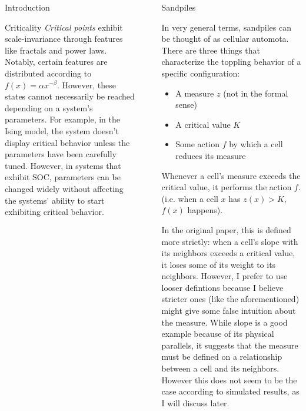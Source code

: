 \documentclass[final]{beamer}
\newlength{\sepwid}
\newlength{\onecolwid}
\begin{document}
\begin{frame}[t]
\begin{columns}[t]
\begin{column}{\onecolwid}
\begin{block}{Introduction}
\end{block}


\begin{block}{Criticality}
\textit{Critical points} exhibit scale-invariance through features like fractals and power laws. Notably, certain features are distributed according to $f(x)=\alpha x^{-\beta}$. However, these states cannot necessarily be reached depending on a system's parameters. For example, in the Ising model, the system doesn't display critical behavior unless the parameters have been carefully tuned. However, in systems that exhibit SOC, parameters can be changed widely without affecting the systems' ability to start exhibiting critical behavior.
\end{block}


\end{column} %

\begin{column}{\sepwid}\end{column} %

\begin{column}{\onecolwid} %


\begin{block}{Sandpiles}

In very general terms, sandpiles can be thought of as cellular automota. There are three things that characterize the toppling behavior of a specific configuration:
\begin{itemize}
\item A measure $z$ (not in the formal sense)
\item A critical value $K$
\item Some action $f$ by which a cell reduces its measure
\end{itemize} 
Whenever a cell's measure exceeds the critical value, it performs the action $f$. (i.e. when a cell $x$ has $z(x)>K$, $f(x)$ happens).

In the original paper, this is defined more strictly: when a cell's slope with its neighbors exceeds a critical value, it loses some of its weight to its neighbors. However, I prefer to use looser defintions because I believe stricter ones (like the aforementioned) might give some false intuition about the measure. While slope is a good example because of its physical parallels, it suggests that the measure must be defined on a relationship between a cell and its neighbors. However this does not seem to be the case according to simulated results, as I will discuss later.


\end{block}
\end{column}
\end{columns}
\end{frame}
\end{document}

